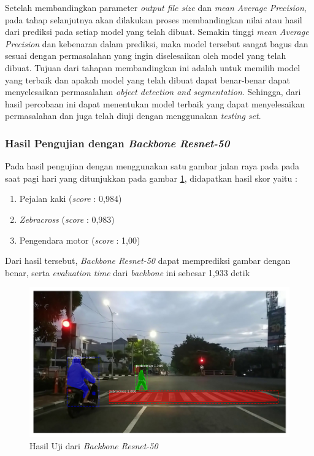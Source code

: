 Setelah membandingkan parameter \textit{output file size} dan \textit{mean Average Precision}, pada tahap selanjutnya akan dilakukan proses membandingkan nilai atau hasil dari prediksi pada setiap model yang telah dibuat. Semakin tinggi \textit{mean Average Precision} dan kebenaran dalam prediksi, maka model tersebut sangat bagus dan sesuai dengan permasalahan yang ingin diselesaikan oleh model yang telah dibuat. Tujuan dari tahapan membandingkan ini adalah untuk memilih model yang terbaik dan apakah model yang telah dibuat dapat benar-benar dapat menyelesaikan permasalahan \textit{object detection and segmentation}. Sehingga, dari hasil percobaan ini dapat menentukan model terbaik yang dapat menyelesaikan permasalahan dan juga telah diuji dengan menggunakan\textit{ testing set}.

\subsubsection{Hasil Pengujian dengan \textit{Backbone Resnet-50}}

Pada hasil pengujian dengan menggunakan satu gambar jalan raya pada pada saat pagi hari yang ditunjukkan pada gambar \ref{fig:hasil-resnet50}, didapatkan hasil skor yaitu :
\begin{enumerate}[nolistsep]
	\item Pejalan kaki (\textit{score} : 0,984)
	\item \textit{Zebracross} (\textit{score} : 0,983)
	\item Pengendara motor (\textit{score} : 1,00)
\end{enumerate}
Dari hasil tersebut, \textit{Backbone Resnet-50} dapat memprediksi gambar dengan benar, serta \textit{evaluation time} dari \textit{backbone} ini sebesar 1,933 detik
\begin{figure}[h] 
	\centering
	\includegraphics[scale=0.3]{gambar/fajar-frame800-resnet50.png}
	\caption{Hasil Uji dari \textit{Backbone Resnet-50}}
	\label{fig:hasil-resnet50}
\end{figure}

